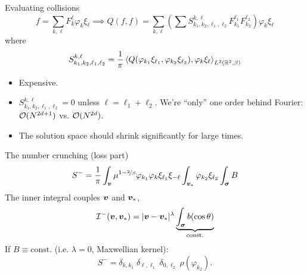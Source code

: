 \documentclass[hyperref={bookmarksopen, colorlinks, linkcolor=blue, urlcolor=green, citecolor=red}, color={usenames,dvipsnames}]{beamer}
\newcommand{\good}{\smiley}
\newcommand{\bad}{\frownie}
\begin{document}
\begin{frame}{Evaluating collisions}
\begin{equation*}
    f = \sum_{k,\ell} F_k^\ell\varphi_k\xi_\ell \implies
    Q(f,f) = \sum_{k,\ell} 
    \left( \sum S_{k_1,k_2,\ell_1,\ell_2}^{k,\ell} F_{k_1}^{\ell_1} F_{k_2}^{\ell_2} \right) 
    \varphi_k\xi_\ell
\end{equation*}
where
\begin{equation*}
    S_{k_1,k_2,\ell_1,\ell_2}^{k,\ell} = \frac{1}{\pi} \left\langle 
    Q(\varphi_{k_1}\xi_{\ell_1}, \varphi_{k_2}\xi_{\ell_2}), \varphi_k \xi_\ell
    \right\rangle_{L^2(\mathbb{R}^2,\beta)}
\end{equation*}
\begin{itemize}
    \item[\bad] Expensive.
    \item[\good] $S_{k_1,k_2,\ell_1,\ell_2}^{k,\ell} = 0$ 
        unless $\ell=\ell_1+\ell_2$. We're ``only'' one order behind Fourier:
        $\mathcal{O}(N^{2d+1})$ vs. $\mathcal{O}(N^{2d})$.
    \item[\good] The solution space should shrink significantly for large times.
\end{itemize}
\end{frame}

\begin{frame}{The number crunching (loss part)}
\begin{equation*}
    S^{-} = \frac{1}{\pi} 
    \int_{{\bm v}} \mu^{1-\nicefrac{2}{\beta}} \varphi_{k_1} \varphi_k \xi_{\ell_1} \xi_{-\ell}
    \int_{{\bm v}_\ast} \varphi_{k_2} \xi_{\ell_2}
    \int_{\bm\sigma} B
\end{equation*}
The inner integral couples ${\bm v}$ and ${\bm v}_\ast$,
\begin{equation*}
    \mathcal{I}^-({\bm v},{\bm v}_\ast) = |{\bm v}-{\bm v}_\ast|^\lambda 
    \underbrace{\int_{\bm\sigma} b(\cos\theta)}_{\text{const.}}
\end{equation*}
If $B\equiv\text{const.}$ (i.e. $\lambda=0$, Maxwellian kernel):
\begin{equation*}
    S^{-} = \delta_{k,k_1} \; \delta_{\ell,\ell_1} \; \delta_{0,\ell_2} \; \rho(\varphi_{k_2}).
\end{equation*}
\end{frame}
\end{document}
